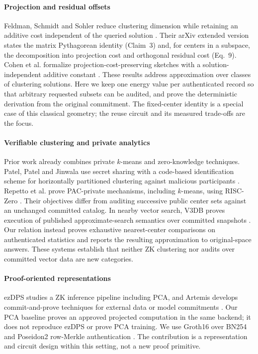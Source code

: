 \documentclass[5p,times,twocolumn]{elsarticle}
\theoremstyle{plain}
\theoremstyle{definition}
\theoremstyle{remark}
\begin{document}
\paragraph{\textcolor{RevisionRed}{Projection and residual offsets}}
\begingroup\color{RevisionRed}
Feldman, Schmidt and Sohler reduce clustering dimension while retaining an additive cost independent of the queried solution \cite{feldman2013tiny,feldman2020tiny}. Their arXiv extended version states the matrix Pythagorean identity (Claim~3) and, for centers in a subspace, the decomposition into projection cost and orthogonal residual cost (Eq.~9). Cohen et al. formalize projection-cost-preserving sketches with a solution-independent additive constant \cite{cohen2015dimensionality}. These results address approximation over classes of clustering solutions. Here we keep one energy value per authenticated record so that arbitrary requested subsets can be audited, and prove the deterministic derivation from the original commitment. The fixed-center identity is a special case of this classical geometry; the reuse circuit and its measured trade-offs are the focus.


\par\endgroup
\paragraph{\textcolor{RevisionRed}{Verifiable clustering and private analytics}}
\begingroup\color{RevisionRed}
Prior work already combines private $k$-means and zero-knowledge techniques. Patel, Patel and Jinwala use secret sharing with a code-based identification scheme for horizontally partitioned clustering against malicious participants \cite{patel2013clustering}. Repetto et al. prove PAC-private mechanisms, including $k$-means, using RISC-Zero \cite{repetto2026pac}. Their objectives differ from auditing successive public center sets against an unchanged committed catalog. In nearby vector search, V3DB proves execution of published approximate-search semantics over committed snapshots \cite{v3db2026}. Our relation instead proves exhaustive nearest-center comparisons on authenticated statistics and reports the resulting approximation to original-space answers. These systems establish that neither ZK clustering nor audits over committed vector data are new categories.


\par\endgroup
\paragraph{\textcolor{RevisionRed}{Proof-oriented representations}}
\begingroup\color{RevisionRed}
ezDPS studies a ZK inference pipeline including PCA, and Artemis develops commit-and-prove techniques for external data or model commitments \cite{ezdps2023,artemis2024}. Our PCA baseline proves an approved projected computation in the same backend; it does not reproduce ezDPS or prove PCA training. We use Groth16 over BN254 and Poseidon2 row-Merkle authentication \cite{groth2016,poseidon22023}. The contribution is a representation and circuit design within this setting, not a new proof primitive.
\end{document}
